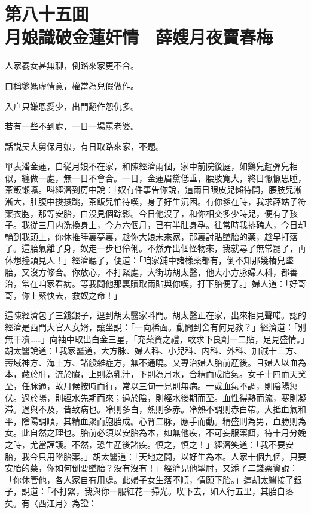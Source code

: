 
\chapter*{第八十五囬　\\月娘識破金蓮奸情　薛嫂月夜賣春梅}
\thispagestyle{empty}

\begin{myquote}
人家養女甚無聊，倒踏來家更不合。

口稱爹媽虚情意，權當為兒假做作。

入户只嫌恩愛少，出門翻作怨仇多。

若有一些不到處，一日一場罵老婆。
\end{myquote}

話説吴大舅保月娘，有日取路來家，不題。

單表潘金蓮，自従月娘不在家，和陳經濟兩個，家中前院後庭，如鷄兒趕彈兒相似，纏做一處，無一日不會合。一日，金蓮眉黛低垂，腰肢寬大，終日懨懨思睡，茶飯懶嚥。呌經濟到房中說：「奴有件事告你說，這兩日眼皮兒懶待開，腰肢兒漸漸大，肚腹中捘捘跳，茶飯兒怕待喫，身子好生沉困。有你爹在時，我求薛姑子符薬衣胞，那等安胎，白沒見個踪影。今日他沒了，和你相交多少時兒，便有了孩子。我従三月内洗換身上，今方六個月，已有半肚身孕。往常時我排磕人，今日却輪到我頭上，你休推睡裏夢裏，趁你大娘未來家，那裏討貼墜胎的薬，趁早打落了。這胎氣離了身，奴走一步也伶俐。不然弄出個怪物來，我就尋了無常罷了，再休想擡頭見人！」經濟聽了，便道：「咱家舖中諸樣薬都有，倒不知那幾樁兒墜胎，又沒方修合。你放心，不打緊處，大街坊胡太醫，他大小方脉婦人科，都善治，常在咱家看病。等我問他那裏贖取兩貼與你喫，打下胎便了。」婦人道：「好哥哥，你上緊快去，救奴之命！」

這陳經濟包了三錢銀子，逕到胡太醫家呌門。胡太醫正在家，出來相見聲喏。認的經濟是西門大官人女婿，讓坐說：「一向稀面。動問到舍有何見教？」經濟道：「別無干凟……」向袖中取出白金三星，「充薬資之禮，敢求下良劑一二貼，足見盛情。」胡太醫說道：「我家醫道，大方脉、婦人科、小兒科、内科、外科、加減十三方、壽域神方、海上方、諸般雜症方，無不通曉。又專治婦人胎前産後。且婦人以血為本，藏於肝，流於臟，上則為乳汁，下則為月水，合精而成胎氣。女子十四而天癸至，任脉通，故月候按時而行，常以三旬一見則無病。一或血氣不調，則陰陽愆伏。過於陽，則經水先期而來；過於陰，則經水後期而至。血性得熱而流，寒則凝滞。過與不及，皆致病也。冷則多白，熱則多赤。冷熱不調則赤白帶。大抵血氣和平，陰陽調順，其精血聚而胞胎成。心腎二脉，應手而動。精盛則為男，血勝則為女。此自然之理也。胎前必須以安胎為本，如無他疾，不可妄服薬餌，待十月分娩之時，尤當謹護。不然，恐生産後諸疾。慎之，慎之！」經濟笑道：「我不要安胎，我今只用墜胎薬。」胡太醫道：「天地之間，以好生為本。人家十個九個，只要安胎的薬，你如何倒要墜胎？没有沒有！」經濟見他掣肘，又添了二錢薬資說：「你休管他，各人家自有用處。此婦子女生落不順，情願下胎。」這胡太醫接了銀子，說道：「不打緊，我與你一服紅花一掃光。喫下去，如人行五里，其胎自落矣。有〈西江月〉為證：

